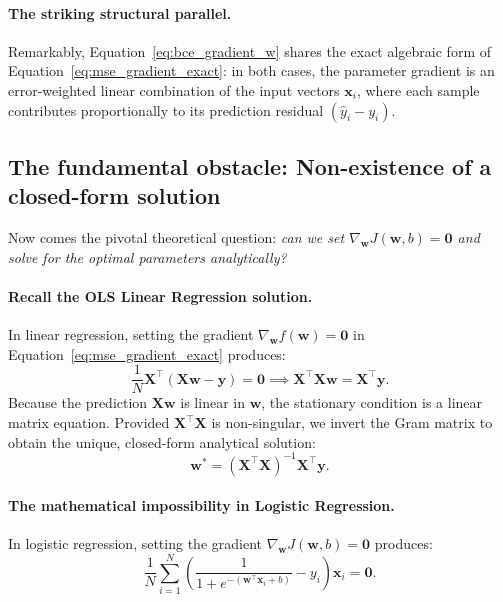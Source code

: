 \paragraph{The striking structural parallel.}
Remarkably, Equation~\eqref{eq:bce_gradient_w} shares the exact algebraic form of Equation~\eqref{eq:mse_gradient_exact}: in both cases, the parameter gradient is an error-weighted linear combination of the input vectors $\mathbf{x}_i$, where each sample contributes proportionally to its prediction residual $(\hat{y}_i - y_i)$.

\subsection{The fundamental obstacle: Non-existence of a closed-form solution}
\label{sec:no_closed_form_solution}

Now comes the pivotal theoretical question: \textit{can we set $\nabla_\mathbf{w} J(\mathbf{w}, b) = \mathbf{0}$ and solve for the optimal parameters analytically?}

\paragraph{Recall the OLS Linear Regression solution.}
In linear regression, setting the gradient $\nabla_\mathbf{w} f(\mathbf{w}) = \mathbf{0}$ in Equation~\eqref{eq:mse_gradient_exact} produces:
\begin{equation}
\frac{1}{N} \mathbf{X}^\top (\mathbf{X}\mathbf{w} - \mathbf{y}) = \mathbf{0} \implies \mathbf{X}^\top \mathbf{X} \mathbf{w} = \mathbf{X}^\top \mathbf{y}.
\end{equation}
Because the prediction $\mathbf{X}\mathbf{w}$ is linear in $\mathbf{w}$, the stationary condition is a linear matrix equation. Provided $\mathbf{X}^\top \mathbf{X}$ is non-singular, we invert the Gram matrix to obtain the unique, closed-form analytical solution:
\begin{equation}
\mathbf{w}^* = (\mathbf{X}^\top \mathbf{X})^{-1} \mathbf{X}^\top \mathbf{y}.
\end{equation}

\paragraph{The mathematical impossibility in Logistic Regression.}
In logistic regression, setting the gradient $\nabla_\mathbf{w} J(\mathbf{w}, b) = \mathbf{0}$ produces:
\begin{equation}
\frac{1}{N} \sum_{i=1}^N \left( \frac{1}{1 + e^{-(\mathbf{w}^\top \mathbf{x}_i + b)}} - y_i \right) \mathbf{x}_i = \mathbf{0}.
\label{eq:logistic_stationary_condition}
\end{equation}

